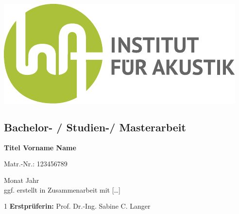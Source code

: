 \documentclass[a4paper,12pt,nexus, rgb]{tubsartcl}
\begin{document}
\begin{gausspage}
\begin{segment}[c,bgcolor=tubsLightGray]{2}	
\end{segment}
\begin{segment}[c,bgcolor=tubsWhite]{2}	
	\begin{center}
	\includegraphics[scale=0.5]{../pics/placeholder} 
	\end{center}
\end{segment}
\begin{segment}[c,bgcolor=InAGreen,fgcolor=tubsWhite]{3}					\large \noindent
\section*{\textcolor{tubsWhite}{Bachelor- / Studien-/  Masterarbeit}} 	
\textbf{
Titel Vorname Name 		
}

Matr.-Nr.: 123456789

{\small
Monat Jahr	\\
ggf. erstellt in Zusammenarbeit mit [\ldots]
}
\end{segment}
\begin{segment}[innerpadding=vnone,bgcolor=tubsGreen,%
	fgcolor=tubsWhite]{1} \vskip-3pt \large%
\textbf{Erstprüferin:} Prof. Dr.-Ing. Sabine C. Langer
\end{segment}
\end{gausspage}
\end{document}
